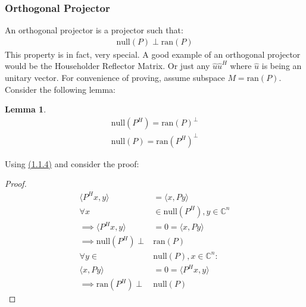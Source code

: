 \documentclass[]{article}
\theoremstyle{definition}
\newtheorem{lemma}{Lemma}
\begin{document}
        \subsubsection{Orthogonal Projector}
            An orthogonal projector is a projector such that: 
            \begin{align}
                \text{null}(P) \perp \text{ran}(P)
            \end{align}
            This property is in fact, very special. A good example of an orthogonal projector would be the Householder Reflector Matrix. Or just any $\hat{u}\hat{u}^H$ where $\hat{u}$ is being an unitary vector. For convenience of proving, assume subspace $M = \text{ran}(P)$. Consider the following lemma: 
            \begin{lemma}
                \begin{align}
                    \text{null}(P^H) = \text{ran}(P)^{\perp}
                    \\
                    \text{null}(P) = \text{ran}(P^H)^{\perp}
                \end{align}    
            \end{lemma}
            \noindent
            Using \hyperref[a:1.1.4]{(1.1.4)} and consider the proof: 
            \begin{proof}
                \begin{align}
                    \langle P^Hx, y\rangle &= \langle x, Py\rangle 
                    \\
                    \forall  x &\in \text{null}(P^H), y\in \mathbb{C}^n
                    \\
                    \implies \langle P^Hx ,y\rangle &= 0 = \langle x, Py\rangle
                    \\
                    \implies \text{null}(P^H) \perp& \text{ran}(P)
                    \\
                    \forall y \in& \text{null}(P), x \in \mathbb{C}^n: 
                    \\
                    \langle x, Py\rangle &= 0 = \langle P^Hx, y\rangle
                    \\
                    \implies \text{ran}(P^H) \perp& \text{null}(P)
                \end{align}
            \end{proof}
            
\end{document}

